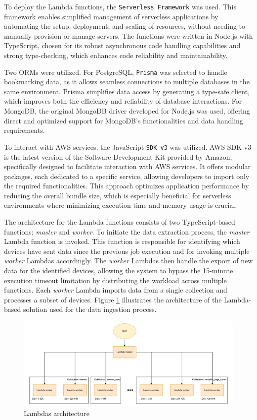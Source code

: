 To deploy the Lambda functions, the \texttt{Serverless Framework} was used. This framework enables simplified management of serverless applications by automating the setup, deployment, and scaling of resources, without needing to manually provision or manage servers. The functions were written in Node.js with TypeScript, chosen for its robust asynchronous code handling capabilities and strong type-checking, which enhances code reliability and maintainability.

Two \acp{ORM} were utilized. For PostgreSQL, \texttt{Prisma} was selected to handle bookmarking data, as it allows seamless connections to multiple databases in the same environment. Prisma simplifies data access by generating a type-safe client, which improves both the efficiency and reliability of database interactions. For MongoDB, the original MongoDB driver developed for Node.js was used, offering direct and optimized support for MongoDB’s functionalities and data handling requirements.

To interact with AWS services, the JavaScript \texttt{\ac{SDK} v3} was utilized. AWS \ac{SDK} v3 is the latest version of the Software Development Kit provided by Amazon, specifically designed to facilitate interaction with AWS services. It offers modular packages, each dedicated to a specific service, allowing developers to import only the required functionalities. This approach optimizes application performance by reducing the overall bundle size, which is especially beneficial for serverless environments where minimizing execution time and memory usage is crucial.

The architecture for the Lambda functions consists of two TypeScript-based functions: \textit{master} and \textit{worker}. To initiate the data extraction process, the \textit{master} Lambda function is invoked. This function is responsible for identifying which devices have sent data since the previous job execution and for invoking multiple \textit{worker} Lambdas accordingly. The \textit{worker} Lambdas then handle the export of new data for the identified devices, allowing the system to bypass the 15-minute execution timeout limitation by distributing the workload across multiple functions. Each \textit{worker} Lambda imports data from a single collection and processes a subset of devices. Figure \ref{fig:lamschema} illustrates the architecture of the Lambda-based solution used for the data ingestion process.
\begin{figure}[H]
    \centering
    \includegraphics[width=1\textwidth]{res/lambda-schema.pdf}
    \caption{Lambdas architecture}
    \label{fig:lamschema}
\end{figure}

